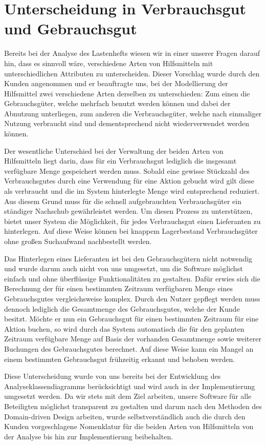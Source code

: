 \section{Unterscheidung in Verbrauchsgut und Gebrauchsgut}
Bereits bei der Analyse des Lastenhefts wiesen wir in einer unserer Fragen darauf hin, dass es sinnvoll wäre, verschiedene Arten von Hilfsmitteln mit unterschiedlichen Attributen zu unterscheiden. Dieser Vorschlag wurde durch den Kunden angenommen und er beauftragte uns, bei der Modellierung der Hilfsmittel zwei verschiedene Arten derselben zu unterschieden: Zum einen die Gebrauchsgüter, welche mehrfach benutzt werden können und dabei der Abnutzung unterliegen, zum anderen die Verbrauchsgüter, welche nach einmaliger Nutzung verbraucht sind und dementsprechend nicht wiederverwendet werden können. 

Der wesentliche Unterschied bei der Verwaltung der beiden Arten von Hilfsmitteln liegt darin, dass für ein Verbrauchsgut lediglich die insgesamt verfügbare Menge gespeichert werden muss. Sobald eine gewisse Stückzahl des Verbrauchsgutes durch eine Verwendung für eine Aktion gebucht wird gilt diese als verbraucht und die im System hinterlegte Menge wird entsprechend reduziert. Aus diesem Grund muss für die schnell aufgebrauchten Verbrauchsgüter ein ständiger Nachschub gewährleistet werden. Um diesen Prozess zu unterstützen, bietet unser System die Möglichkeit, für jedes Verbrauchsgut einen Lieferanten zu hinterlegen. Auf diese Weise können bei knappem Lagerbestand Verbrauchsgüter ohne großen Suchaufwand nachbestellt werden. 

Das Hinterlegen eines Lieferanten ist bei den Gebrauchsgütern nicht notwendig und wurde darum auch nicht von uns umgesetzt, um die Software möglichst einfach und ohne überflüssige Funktionalitäten zu gestalten. Dafür erwies sich die Berechnung der für einen bestimmten Zeitraum verfügbaren Menge eines Gebrauchsgutes vergleichsweise komplex. Durch den Nutzer gepflegt werden muss dennoch lediglich die Gesamtmenge des Gebrauchsgutes, welche der Kunde besitzt. Möchte er nun ein Gebrauchsgut für einen bestimmten Zeitraum für eine Aktion buchen, so wird durch das System automatisch die für den geplanten Zeitraum verfügbare Menge auf Basis der vorhanden Gesamtmenge sowie weiterer Buchungen des Gebrauchsgutes berechnet. Auf diese Weise kann ein Mangel an einem bestimmten Gebrauchsgut frühzeitig erkannt und behoben werden. 

Diese Unterscheidung wurde von uns bereits bei der Entwicklung des Analyseklassendiagramms berücksichtigt und wird auch in der Implementierung umgesetzt werden. Da wir stets mit dem Ziel arbeiten, unsere Software für alle Beteiligten möglichst transparent zu gestalten und darum nach den Methoden des Domain-driven Design arbeiten, wurde selbstverständlich auch die durch den Kunden vorgeschlagene Nomenklatur für die beiden Arten von Hilfsmitteln von der Analyse bis hin zur Implementierung beibehalten. 
